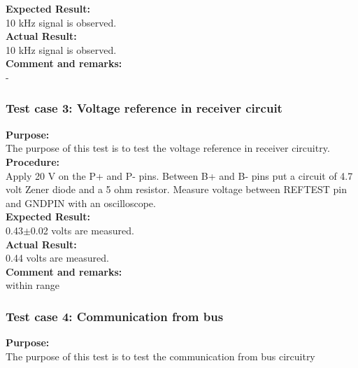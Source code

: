 \textbf{Expected Result:}\\
10 kHz signal is observed.\\

\textbf{Actual Result:}\\
10 kHz signal is observed.\\

\textbf{Comment and remarks:}\\
-\\

\subsubsection{Test case 3: Voltage reference in receiver circuit}
\textbf{Purpose:}\\
The purpose of this test is to test the voltage reference in receiver circuitry.\\

\textbf{Procedure:}\\
Apply 20 V on the P+ and P- pins. Between B+ and B- pins put a circuit of 4.7 volt Zener diode and a 5 ohm resistor. Measure voltage between REFTEST pin and GNDPIN with an oscilloscope.\\

\textbf{Expected Result:}\\
0.43$\pm$0.02 volts are measured.\\

\textbf{Actual Result:}\\
0.44 volts are measured.\\

\textbf{Comment and remarks:}\\
within range\\

\subsubsection{Test case 4: Communication from bus}
\textbf{Purpose:}\\
The purpose of this test is to test the communication from bus circuitry\\


